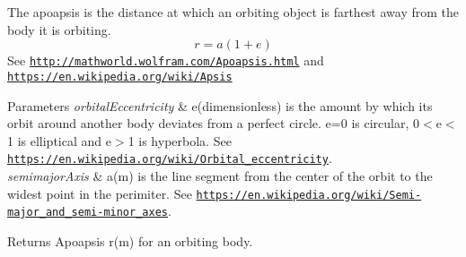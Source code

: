 The apoapsis is the distance at which an orbiting object is farthest away from the body it is orbiting. \[r=a(1+e)\] See \href{http://mathworld.wolfram.com/Apoapsis.html}{\tt http\+://mathworld.\+wolfram.\+com/\+Apoapsis.\+html} and \href{https://en.wikipedia.org/wiki/Apsis}{\tt https\+://en.\+wikipedia.\+org/wiki/\+Apsis}


\begin{DoxyParams}{Parameters}
{\em orbital\+Eccentricity} & e(dimensionless) is the amount by which its orbit around another body deviates from a perfect circle. e=0 is circular, 0$<$e$<$1 is elliptical and e$>$1 is hyperbola. See \href{https://en.wikipedia.org/wiki/Orbital_eccentricity}{\tt https\+://en.\+wikipedia.\+org/wiki/\+Orbital\+\_\+eccentricity}. \\
\hline
{\em semimajor\+Axis} & a(m) is the line segment from the center of the orbit to the widest point in the perimiter. See \href{https://en.wikipedia.org/wiki/Semi-major_and_semi-minor_axes}{\tt https\+://en.\+wikipedia.\+org/wiki/\+Semi-\/major\+\_\+and\+\_\+semi-\/minor\+\_\+axes}. \\
\hline
\end{DoxyParams}
\begin{DoxyReturn}{Returns}
Apoapsis r(m) for an orbiting body. 
\end{DoxyReturn}
